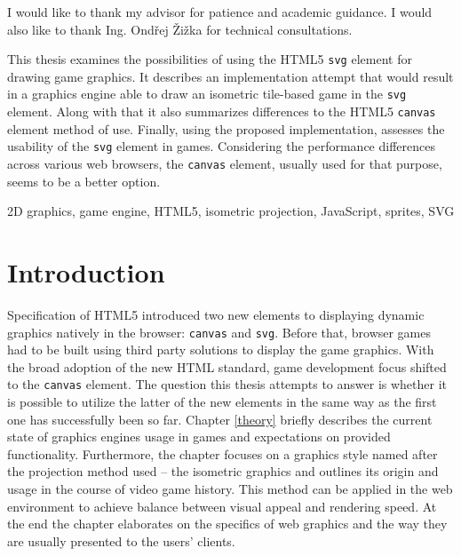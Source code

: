 \documentclass[11pt,oneside, final]{fithesis2}
\begin{document}
  
\FrontMatter  
\ThesisTitlePage  
 
\begin{ThesisDeclaration}  
\DeclarationText  
\AdvisorName  
\end{ThesisDeclaration}  
 
\begin{ThesisThanks}  
I would like to thank my advisor for patience and academic guidance. I would also like to thank Ing. Ondřej Žižka for technical consultations.
\end{ThesisThanks}  
 
\begin{ThesisAbstract}  
This thesis examines the possibilities of using the HTML5 \texttt{svg} element for drawing game graphics. It describes an implementation attempt that would result in a graphics engine able to draw an isometric tile-based game in the \texttt{svg} element. Along with that it also summarizes differences to the HTML5 \texttt{canvas} element method of use. Finally, using the proposed implementation, assesses the usability of the \texttt{svg} element in games. Considering the performance differences across various web browsers, the \texttt{canvas} element, usually used for that purpose, seems to be a better option.
\end{ThesisAbstract}  
 
\begin{ThesisKeyWords}  
2D graphics, game engine, HTML5, isometric projection, JavaScript, sprites, SVG
\end{ThesisKeyWords}  
 
\MainMatter
 
\tableofcontents          %
 
\chapter{Introduction}
Specification of HTML5 introduced two new elements to displaying dynamic graphics natively in the browser: \texttt{canvas} and \texttt{svg}\cite{w3_html5}. Before that, browser games had to be built using third party solutions to display the game graphics\cite{pagella}. With the broad adoption of the new HTML standard, game development focus shifted to the \texttt{canvas} element\cite{pagella}. The question this thesis attempts to answer is whether it is possible to utilize the latter of the new elements in the same way as the first one has successfully been so far. Chapter \ref{theory} briefly describes the current state of graphics engines usage in games and expectations on provided functionality. Furthermore, the chapter focuses on a graphics style named after the projection method used -- the isometric graphics and outlines its origin and usage in the course of video game history. This method can be applied in the web environment to achieve balance between visual appeal and rendering speed. At the end the chapter elaborates on the specifics of web graphics and the way they are usually presented to the users' clients.
\end{document}
